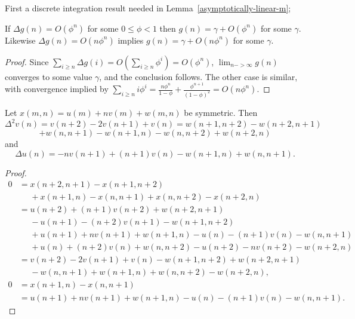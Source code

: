 \documentclass{article}
\begin{document}
First a discrete integration result
needed in Lemma~\ref{asymptotically-linear-m};

\begin{lemma}
  \label{technical-lemma}
  If $\Delta g(n) = O(\phi^n)$ for some $0 \leq \phi < 1$
  then $g(n) = \gamma + O(\phi^n)$ for some $\gamma$.
  Likewise $\Delta g(n) = O(n\phi^n)$
  implies $g(n) = \gamma + O(n \phi^n)$ for some $\gamma$.
\end{lemma}
\begin{proof}
  Since $\sum_{i\geq n} \Delta g(i) = O(\sum_{i\geq n} \phi^i) = O(\phi^n)$,
  $\lim_{n->\infty}g(n)$ converges to some value $\gamma$, and the conclusion
  follows.
  The other case is similar, with convergence implied by
  $\sum_{i\geq n} i\phi^i =
  \frac{n\phi^n}{1-\phi}+\frac{\phi^{n+1}}{(1-\phi)^2} = O(n\phi^n)$.
\end{proof}

\begin{lemma}
  \label{symmetric-asymptotically-linear-n}
  Let $x(m,n) = u(m) + n v(m) + w(m,n)$ be symmetric. Then
  \[ \Delta^2 v(n) = v(n+2)-2v(n+1)+v(n) = w(n+1,n+2)-w(n+2,n+1) \]
  \[ + w(n,n+1)-w(n+1,n) - w(n,n+2) + w(n+2,n) \]
  and
  \[ \Delta u(n) = -n v(n+1) + (n+1) v(n) - w(n+1,n) + w(n,n+1). \]
\end{lemma}

\begin{proof}
  \[
  \begin{split}
    0 &= x(n+2,n+1)-x(n+1,n+2) \\
&\phantom{=} + x(n+1,n)-x(n,n+1) + x(n,n+2)-x(n+2,n) \\
    &= u(n+2)+(n+1)v(n+2)+w(n+2,n+1) \\
&\phantom{=} -u(n+1)-(n+2)v(n+1)-w(n+1,n+2) \\
&\phantom{=} +u(n+1)+nv(n+1)+w(n+1,n) - u(n)-(n+1)v(n)-w(n,n+1) \\
&\phantom{=} +u(n)+(n+2)v(n)+w(n,n+2) - u(n+2)-nv(n+2)-w(n+2,n) \\
    &= v(n+2) -2v(n+1) + v(n) -w(n+1,n+2)+w(n+2,n+1) \\
    &\phantom{=} -w(n,n+1)+w(n+1,n) +w(n,n+2)-w(n+2,n),
  \end{split}
  \]
  \[
  \begin{split}
    0 &= x(n+1,n) - x(n,n+1) \\
      & = u(n+1) + n v(n+1) + w(n+1,n) - u(n) - (n+1) v(n) - w(n,n+1).
  \end{split}
  \]
\end{proof}
\end{document}
